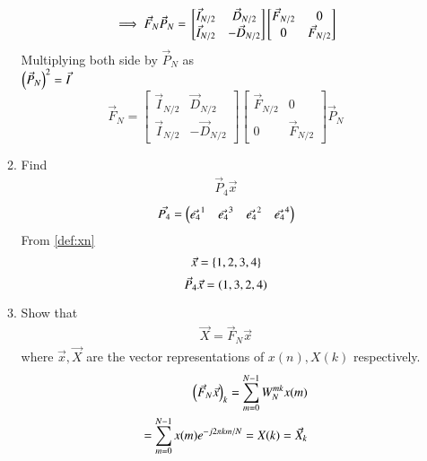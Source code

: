 \documentclass[journal,12pt,twocolumn]{IEEEtran}
\renewcommand\thesection{\arabic{section}}
\begin{document}
\begin{enumerate}[label=\thesection.\arabic*]
\begin{enumerate}[label=\arabic*.,ref=\thesection.\theenumi]
\begin{equation}
	\implies \vec{F}_{N} \vec{P}_{N}=\\
	\begin{bmatrix}
		\vec{I}_{N/2} & \vec{D}_{N/2} \\
		\vec{I}_{N/2} & -\vec{D}_{N/2}
	\end{bmatrix}
	\begin{bmatrix}
		\vec{F}_{N/2} & 0 \\
		0 & \vec{F}_{N/2}
	\end{bmatrix}
\end{equation}
Multiplying both side by $\vec{P}_{N}$ as \\ $\left(\vec{P}_{N}\right)^{2} = \vec{I}$
\begin{equation}
	\boxed{\vec{F}_{N} =
	\begin{bmatrix}
		\vec{I}_{N/2} & \vec{D}_{N/2} \\
		\vec{I}_{N/2} & -\vec{D}_{N/2}
	\end{bmatrix}
	\begin{bmatrix}
		\vec{F}_{N/2} & 0 \\
		0 & \vec{F}_{N/2}
	\end{bmatrix}\vec{P}_{N}}
\end{equation}
	\item Find 
	\begin{align}
		\vec{P}_4 \vec{x}
	\end{align}
	\solution
	\begin{equation}
		\vec{P_4} = \begin{pmatrix}\vec{e_4}^{1} & \vec{e_4}^{3} & \vec{e_4}^{2} & \vec{e_4}^{4}\end{pmatrix}
	\end{equation}
	From \eqref{def:xn}
	\begin{equation}
		\vec{x} = \left\{1,2,3,4\right\}
	\end{equation}
	\begin{equation}
		\vec{P}_{4}\vec{x} = \left(1,3,2,4\right)
	\end{equation}
	\item Show that 
	\begin{align}
		\vec{X} = \vec{F}_N \vec{x}
		\label{eq:dft-mat-def}
	\end{align}
	where $\vec{x}, \vec{X}$ are the vector representations of $x(n), X(k)$ respectively.\\
	\solution
	\begin{align}
		\left(\vec{F}_{N}\vec{x}\right)_{k} = \sum_{m=0}^{N-1}W_{N}^{mk}x(m)\\
		= \sum_{m=0}^{N-1} x(m) e^{-j 2 \pi k m / N}
		= X(k) = \vec{X}_{k} 
	\end{align}

\end{enumerate}
\end{enumerate}
\end{document}
